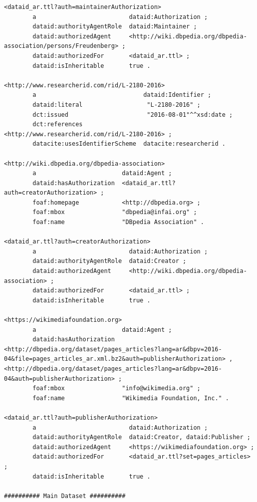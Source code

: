 \documentclass[a4paper,english,twoside,BCOR1.5cm,headsepline,DIV12,appendixprefix,final,12pt]{scrbook}
\begin{document}
\begin{lstlisting}[language=ttl, captionpos=b, label=lst:dcex,linewidth=\columnwidth,breaklines=true,basicstyle=\ttfamily\scriptsize]
<dataid_ar.ttl?auth=maintainerAuthorization>
        a                          dataid:Authorization ;
        dataid:authorityAgentRole  dataid:Maintainer ;
        dataid:authorizedAgent     <http://wiki.dbpedia.org/dbpedia-association/persons/Freudenberg> ;
        dataid:authorizedFor       <dataid_ar.ttl> ;
        dataid:isInheritable       true .

<http://www.researcherid.com/rid/L-2180-2016>
        a                              dataid:Identifier ;
        dataid:literal                  "L-2180-2016" ;
        dct:issued                      "2016-08-01"^^xsd:date ;
        dct:references                  <http://www.researcherid.com/rid/L-2180-2016> ;
        datacite:usesIdentifierScheme  datacite:researcherid .

<http://wiki.dbpedia.org/dbpedia-association>
        a                        dataid:Agent ;
        dataid:hasAuthorization  <dataid_ar.ttl?auth=creatorAuthorization> ;
        foaf:homepage            <http://dbpedia.org> ;
        foaf:mbox                "dbpedia@infai.org" ;
        foaf:name                "DBpedia Association" .

<dataid_ar.ttl?auth=creatorAuthorization>
        a                          dataid:Authorization ;
        dataid:authorityAgentRole  dataid:Creator ;
        dataid:authorizedAgent     <http://wiki.dbpedia.org/dbpedia-association> ;
        dataid:authorizedFor       <dataid_ar.ttl> ;
        dataid:isInheritable       true .
        
<https://wikimediafoundation.org>
        a                        dataid:Agent ;
        dataid:hasAuthorization  <http://dbpedia.org/dataset/pages_articles?lang=ar&dbpv=2016-04&file=pages_articles_ar.xml.bz2&auth=publisherAuthorization> , <http://dbpedia.org/dataset/pages_articles?lang=ar&dbpv=2016-04&auth=publisherAuthorization> ;
        foaf:mbox                "info@wikimedia.org" ;
        foaf:name                "Wikimedia Foundation, Inc." .
        
<dataid_ar.ttl?auth=publisherAuthorization>
        a                          dataid:Authorization ;
        dataid:authorityAgentRole  dataid:Creator, dataid:Publisher ;
        dataid:authorizedAgent     <https://wikimediafoundation.org> ;
        dataid:authorizedFor       <dataid_ar.ttl?set=pages_articles> ;
        dataid:isInheritable       true .
        
########## Main Dataset ##########


\end{lstlisting}
\end{document}
